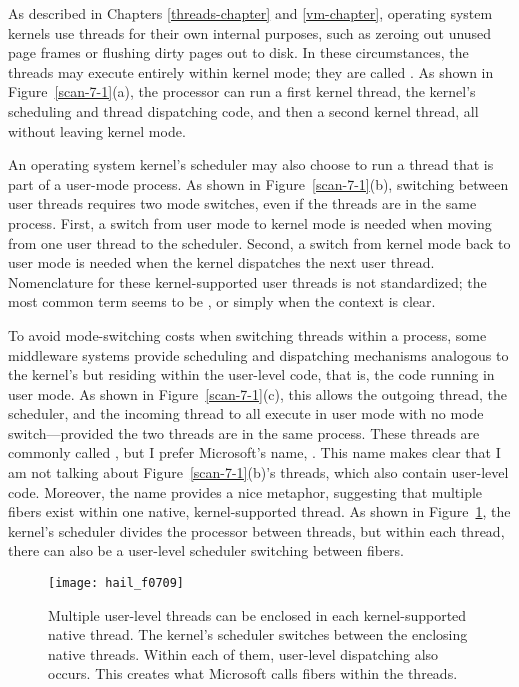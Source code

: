 As described in Chapters \ref{threads-chapter} and \ref{vm-chapter},
operating system kernels use threads for their own internal purposes,
such as zeroing out unused page frames or flushing dirty pages out to
disk. In these circumstances, the threads may execute entirely within
kernel mode; they are called .  As shown in
Figure~\ref{scan-7-1}(a), the processor can run a first kernel thread, the
kernel's scheduling and thread dispatching code, and then a second
kernel thread, all without leaving kernel mode.

An operating system kernel's scheduler may also choose to run a thread
that is part of a user-mode process.  As shown in
Figure~\ref{scan-7-1}(b), switching between user threads requires two
mode switches, even if the threads are in the same process.  First, a
switch from user mode to kernel mode is needed when moving from one
user thread to the scheduler.  Second, a switch from kernel mode back to
user mode is needed when the kernel dispatches the next user thread.
Nomenclature for these kernel-supported user threads is not
standardized; the most common term seems to be
, or simply  when the
context is clear.

To avoid mode-switching costs when switching threads within a process,
some middleware systems provide scheduling and dispatching mechanisms
analogous to the kernel's but residing within the user-level code,
that is, the code running in user mode.  As
shown in Figure~\ref{scan-7-1}(c), this allows the outgoing thread,
the scheduler, and the incoming thread to all execute in user mode
with no mode switch---provided the two threads are in the same
process.  These threads are commonly called
, but I prefer Microsoft's name,
.  This name makes clear that I am not talking about
Figure~\ref{scan-7-1}(b)'s threads, which also contain user-level code.  Moreover, the
name provides a nice
metaphor, suggesting that multiple fibers exist within one native,
kernel-supported thread.  As shown in Figure~\ref{scan-7-2}, the
kernel's scheduler divides the processor between threads, but within
each thread, there can also be a user-level scheduler switching
between fibers.
\begin{figure}
\centerline{\texttt{[image: hail\_f0709]}}
\caption{Multiple user-level threads can be enclosed in each
  kernel-supported native thread. The kernel's scheduler switches
  between the enclosing native threads.  Within each of them,
  user-level dispatching also occurs.  This creates
  what Microsoft calls fibers within the threads.}
\label{scan-7-2}
\end{figure}

